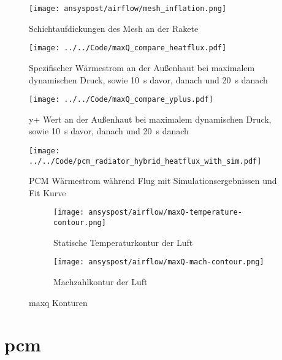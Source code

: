 \begin{figure}[H]
  \centering
  \texttt{[image: ansyspost/airflow/mesh\_inflation.png]}
  \caption{Schichtaufdickungen des Mesh an der Rakete}\label{fig:aussenstroemung_mesh_inflationlayers}
\end{figure}

\begin{figure}[H]
  \centering
  \texttt{[image: ../../Code/maxQ\_compare\_heatflux.pdf]}
  \caption{Spezifischer Wärmestrom an der Außenhaut bei maximalem dynamischen Druck, sowie \SI{10}{s} davor, danach und \SI{20}{s} danach}\label{fig:spezifischer_waermestrom_maxQ_simulationen}
\end{figure}

\begin{figure}[H]
  \centering
  \texttt{[image: ../../Code/maxQ\_compare\_yplus.pdf]}
  \caption{y+ Wert an der Außenhaut bei maximalem dynamischen Druck, sowie \SI{10}{s} davor, danach und \SI{20}{s} danach}\label{fig:yplus_maxQ_simulationen}
\end{figure}

\begin{figure}[H]
  \centering
  \texttt{[image: ../../Code/pcm\_radiator\_hybrid\_heatflux\_with\_sim.pdf]}
  \caption{PCM Wärmestrom während Flug mit Simulationsergebnissen und Fit Kurve}\label{fig:pcm_waermestrom_sim}
\end{figure}

\begin{figure}[H]
    \centering

    \begin{subfigure}{\textwidth}
        \centering
        \texttt{[image: ansyspost/airflow/maxQ-temperature-contour.png]}
        \caption{Statische Temperaturkontur der Luft}
        \label{fig:maxQ_temp_contour}
    \end{subfigure}

    \begin{subfigure}{\textwidth}
        \centering
        \texttt{[image: ansyspost/airflow/maxQ-mach-contour.png]}
        \caption{Machzahlkontur der Luft}
        \label{fig:maxQ_mach_contour}
    \end{subfigure}

    \caption{\texorpdfstring{\ac{maxq}}{max Q} Konturen}
    \label{fig:maxQ_konturen}
\end{figure}

\section{\texorpdfstring{\ac{pcm}}{PCM}}


